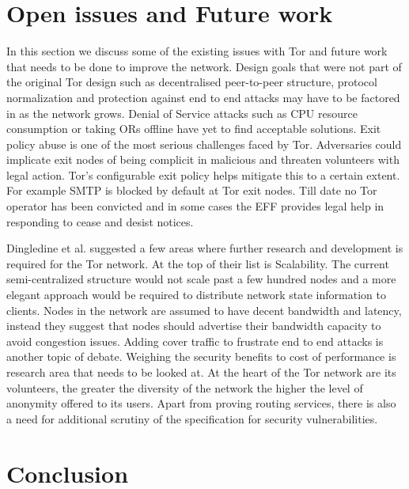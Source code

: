 \documentclass{llncs}
\begin{document}
\section{Open issues and Future work} \label{openissues}
In this section we discuss some of the existing issues with Tor and future work that needs to be done to improve the network. Design goals that were not part of the original Tor design such as decentralised peer-to-peer structure, protocol normalization and protection against end to end attacks may have to be factored in as the network grows. Denial of Service attacks such as CPU resource consumption or taking ORs offline have yet to find acceptable solutions. Exit policy abuse is one of the most serious challenges faced by Tor. Adversaries could implicate exit nodes of being complicit in malicious and threaten volunteers with legal action. Tor's configurable exit policy helps mitigate this to a certain extent. For example SMTP is blocked by default at Tor exit nodes. Till date no Tor operator has been convicted and in some cases the EFF provides legal help in responding to cease and desist notices.

Dingledine et al. \cite{tor-design} suggested a few areas where further research and development is required for the Tor network. At the top of their list is Scalability. The current semi-centralized structure would not scale past a few hundred nodes and a more elegant approach would be required to distribute network state information to clients. Nodes in the network are assumed to have decent bandwidth and latency, instead they suggest that nodes should advertise their bandwidth capacity to avoid congestion issues. Adding cover traffic to frustrate end to end attacks is another topic of debate. Weighing the security benefits to cost of performance is research area that needs to be looked at.
At the heart of the Tor network are its volunteers, the greater the diversity of the network the higher the level of anonymity offered to its users. Apart from proving routing services, there is also a need for additional scrutiny of the specification for security vulnerabilities. 

\section{Conclusion} \label{conclusion}




\end{document}
